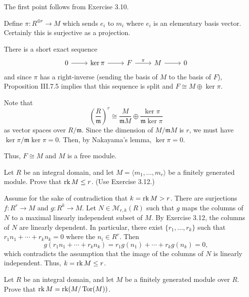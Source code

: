 \documentclass[../../master.tex]{subfiles}
\begin{document}
\begin{solution}
    The first point follows from Exercise 3.10.

    Define $\pi : R^{\oplus r} \to M$ which sends $e_i$ to $m_i$ where $e_i$ is an elementary basis vector.
    Certainly this is surjective as a projection.

    There is a short exact sequence
    \[
    \begin{tikzcd}
        0 & \ker \pi & F & M & 0
        \arrow[from=1-1, to=1-2] 
        \arrow[from=1-2, to=1-3] 
        \arrow[from=1-3, to=1-4, "\pi"] 
        \arrow[from=1-4, to=1-5] 
    \end{tikzcd}
    \]
    and since $\pi$ has a right-inverse (sending the basis of $M$ to the basis of $F$), Proposition III.7.5 implies that this sequence is split and $F \cong M \oplus \ker \pi$.

    Note that
    \[
        \left( \frac{R}{\mathfrak{m}} \right)^{r} \cong \frac{M}{\mathfrak{m}M} \oplus \frac{\ker \pi}{\mathfrak{m} \ker \pi}
    \]
    as vector spaces over $R/\mathfrak{m}$.
    Since the dimension of $M/\mathfrak{m}M$ is $r$, we must have $\ker \pi / \mathfrak{m} \ker \pi = 0$.
    Then, by Nakayama's lemma, $\ker \pi = 0$.

    Thus, $F \cong M$ and $M$ is a free module.
\end{solution}

\begin{problem}
    Let $R$ be an integral domain, and let $M = \langle m_1, \ldots, m_r \rangle$ be a finitely generated module.
    Prove that $\operatorname{rk} M \leq r$. (Use Exercise 3.12.)
\end{problem}

\begin{solution}
    Assume for the sake of contradiction that $k = \operatorname{rk} M > r$.
    There are surjections $f : R^{r} \to M$ and $g : R^{k} \to M$.
    Let $N \in \mathcal{M}_{r, k}(R)$ such that $g$ maps the columns of $N$ to a maximal linearly independent subset of $M$.
    By Exercise 3.12, the columns of $N$ are linearly dependent.
    In particular, there exist $\{r_1, \ldots, r_k\}$ such that $r_1 n_1 + \cdots + r_k n_k = 0$ where the $n_i \in R^{r}$.
    Then
    \[
        g(r_1n_1 + \cdots + r_k n_k) = r_1 g(n_1) + \cdots + r_k g(n_k) = 0,
    \]
    which contradicts the assumption that the image of the columns of $N$ is linearly independent.
    Thus, $k = \operatorname{rk} M \leq r$.
\end{solution}

\begin{problem}
    Let $R$ be an integral domain, and let $M$ be a finitely generated module over $R$.
    Prove that $\operatorname{rk} M = \operatorname{rk} (M / \operatorname{Tor}(M))$.
\end{problem}
\end{document}
